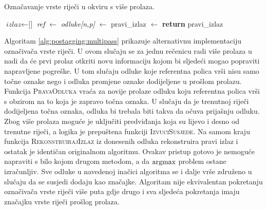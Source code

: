 \begin{algorithm}
\caption{Označavanje vrste riječi u \lts{} okviru s više prolaza.}\label{alg:postagging:multipass}
\begin{algorithmic}[1]
\State $\textit{izlaz} \gets \text{[]}$
    \State \textit{ref} $\gets$ 
    \State \textit{odluke[n,p]} $\gets$ 
  \EndFor
\EndFor
\State pravi\_izlaz $\gets$ 
\State {}
\State \textbf{return} pravi\_izlaz
\EndFunction
\end{algorithmic}
\end{algorithm}

Algoritam \ref{alg:postagging:multipass} prikazuje alternativnu implementaciju
označivača vrste riječi. U ovom slučaju se za jednu rečenicu radi više prolaza u
nadi da će prvi prolaz otkriti novu informaciju kojom bi sljedeći mogao
popraviti napravljene pogreške. U tom slučaju odluke koje referentna polica vrši
nisu samo točne oznake nego i odluka promjene oznake dodijeljene u prošlom
prolazu. Funkcija \textsc{PravaOdluka} vraća za novije prolaze odluku koju
referentna polica vrši s obzirom na to koja je zapravo točna oznaka. U slučaju
da je trenutnoj riječi dodijeljena točna oznaka, odluka bi trebala biti takva da
očuva prijašnju odluku. Zbog više prolaza moguće je uključiti predviđanja koja
su lijevo i desno od trenutne riječi, a logika je prepuštena funkciji
\textsc{IzvuciSusjede}. Na samom kraju funkcija \textsc{RekonstruirajIzlaz} iz
donesenih odluka rekonstruira pravi izlaz i ostatak je identičan originalnom
algoritmu. Ovakav pristup gotovo je nemoguće napraviti s bilo kojom drugom
metodom, a da $\operatorname*{argmax}$ problem ostane izračunljiv. Sve odluke u navedenoj
inačici algoritma se i dalje vrše združeno u slučaju da se susjedi dodaju kao
značajke. Algoritam nije ekvivalentan pokretanju označivača vrste riječi više
puta gdje drugo i sva sljedeća pokretanja imaju značajku vrste riječi prošlog
prolaza.
